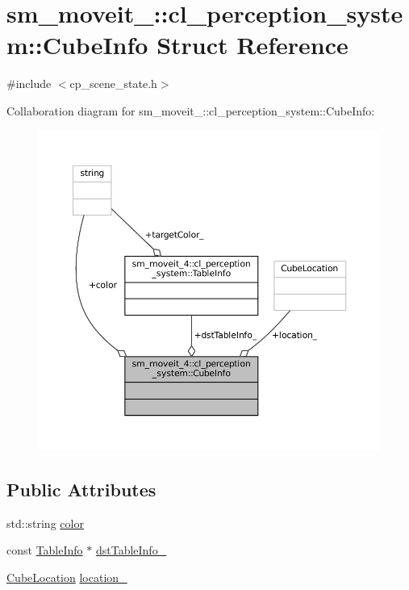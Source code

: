 \hypertarget{structsm__moveit__4_1_1cl__perception__system_1_1CubeInfo}{}\section{sm\+\_\+moveit\+\_\+:\+:cl\+\_\+perception\+\_\+system\+:\+:Cube\+Info Struct Reference}
\label{structsm__moveit__4_1_1cl__perception__system_1_1CubeInfo}


{\ttfamily \#include $<$cp\+\_\+scene\+\_\+state.\+h$>$}



Collaboration diagram for sm\+\_\+moveit\+\_\+:\+:cl\+\_\+perception\+\_\+system\+:\+:Cube\+Info\+:
\nopagebreak
\begin{figure}[H]
\begin{center}
\leavevmode
\includegraphics[width=350pt]{structsm__moveit__4_1_1cl__perception__system_1_1CubeInfo__coll__graph}
\end{center}
\end{figure}
\subsection*{Public Attributes}
\begin{DoxyCompactItemize}
\item 
std\+::string \hyperlink{structsm__moveit__4_1_1cl__perception__system_1_1CubeInfo_a4ef8b67fac001c6d11348ecc26bc03d6}{color}
\item 
const \hyperlink{structsm__moveit__4_1_1cl__perception__system_1_1TableInfo}{Table\+Info} $\ast$ \hyperlink{structsm__moveit__4_1_1cl__perception__system_1_1CubeInfo_a04d8d14d6360780eca68a5026c8da649}{dst\+Table\+Info\+\_\+}
\item 
\hyperlink{namespacesm__moveit__4_1_1cl__perception__system_a0d1b8834532a7cf9d19670791eece6d1}{Cube\+Location} \hyperlink{structsm__moveit__4_1_1cl__perception__system_1_1CubeInfo_ae8534eefae1235f3b98f509916710d63}{location\+\_\+}
\end{DoxyCompactItemize}


